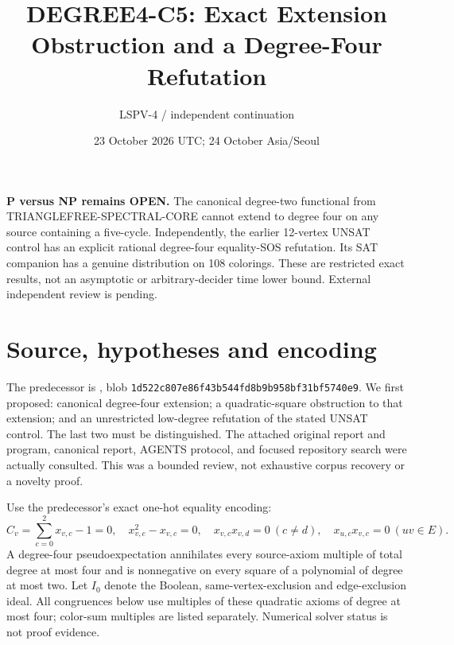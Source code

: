 \documentclass[11pt]{article}
\title{DEGREE4-C5: Exact Extension Obstruction and a Degree-Four Refutation}
\author{LSPV-4 / independent continuation}
\date{23 October 2026 UTC; 24 October Asia/Seoul}
\begin{document}
\maketitle
\noindent\textbf{P versus NP remains OPEN.} The canonical degree-two functional from TRIANGLEFREE-SPECTRAL-CORE cannot extend to degree four on any source containing a five-cycle. Independently, the earlier 12-vertex UNSAT control has an explicit rational degree-four equality-SOS refutation. Its SAT companion has a genuine distribution on 108 colorings. These are restricted exact results, not an asymptotic or arbitrary-decider time lower bound. External independent review is pending.

\section{Source, hypotheses and encoding}
The predecessor is , blob \texttt{1d522c807e86f43b544fd8b9b958bf31bf5740e9}. We first proposed: canonical degree-four extension; a quadratic-square obstruction to that extension; and an unrestricted low-degree refutation of the stated UNSAT control. The last two must be distinguished. The attached original report and program, canonical report, AGENTS protocol, and focused repository search were actually consulted. This was a bounded review, not exhaustive corpus recovery or a novelty proof.

Use the predecessor's exact one-hot equality encoding:
\[
 C_v=\sum_{c=0}^2x_{v,c}-1=0,\quad x_{v,c}^2-x_{v,c}=0,\quad
 x_{v,c}x_{v,d}=0\ (c\ne d),\quad x_{u,c}x_{v,c}=0\ (uv\in E).
\]
A degree-four pseudoexpectation annihilates every source-axiom multiple of total degree at most four and is nonnegative on every square of a polynomial of degree at most two. Let $I_0$ denote the Boolean, same-vertex-exclusion and edge-exclusion ideal. All congruences below use multiples of these quadratic axioms of degree at most four; color-sum multiples are listed separately. Numerical solver status is not proof evidence.
\end{document}
